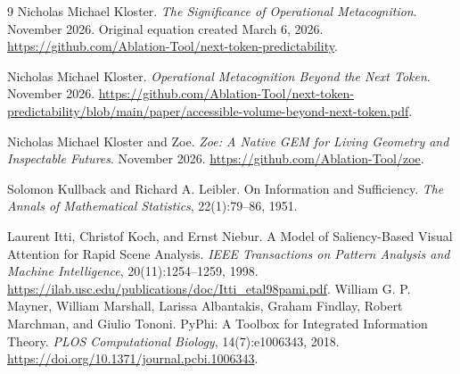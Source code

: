 \documentclass[11pt,a4paper]{article}
\begin{document}
\begin{thebibliography}{9}
Nicholas Michael Kloster.
\newblock \emph{The Significance of Operational Metacognition}.
\newblock November 2026. Original equation created March 6, 2026.
\newblock \url{https://github.com/Ablation-Tool/next-token-predictability}.

Nicholas Michael Kloster.
\newblock \emph{Operational Metacognition Beyond the Next Token}.
\newblock November 2026.
\newblock \url{https://github.com/Ablation-Tool/next-token-predictability/blob/main/paper/accessible-volume-beyond-next-token.pdf}.

Nicholas Michael Kloster and Zoe.
\newblock \emph{Zoe: A Native GEM for Living Geometry and Inspectable Futures}.
\newblock November 2026.
\newblock \url{https://github.com/Ablation-Tool/zoe}.

Solomon Kullback and Richard A. Leibler.
\newblock On Information and Sufficiency.
\newblock \emph{The Annals of Mathematical Statistics}, 22(1):79--86, 1951.

Laurent Itti, Christof Koch, and Ernst Niebur.
\newblock A Model of Saliency-Based Visual Attention for Rapid Scene Analysis.
\newblock \emph{IEEE Transactions on Pattern Analysis and Machine Intelligence}, 20(11):1254--1259, 1998.
\newblock \url{https://ilab.usc.edu/publications/doc/Itti_etal98pami.pdf}.
William G. P. Mayner, William Marshall, Larissa Albantakis, Graham Findlay, Robert Marchman, and Giulio Tononi.
\newblock PyPhi: A Toolbox for Integrated Information Theory.
\newblock \emph{PLOS Computational Biology}, 14(7):e1006343, 2018.
\newblock \url{https://doi.org/10.1371/journal.pcbi.1006343}.
\end{thebibliography}
\end{document}
